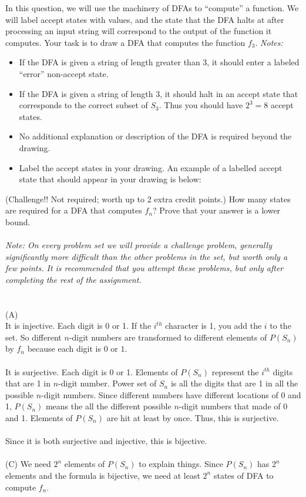 \documentclass[solution, letterpaper]{cs121}
\begin{document}
\subproblem In this question, we will use the machinery of DFAs to ``compute'' a function. We will label accept states with values, and the state that the DFA halts at after processing an input string will correspond to the output of the function it computes. Your task is to draw a DFA that computes the function $f_3$. \textit{Notes: } 
\begin{itemize}
\item If the DFA is given a string of length greater than 3, it should enter a labeled ``error'' non-accept state. 
\item If the DFA is given a string of length 3, it should halt in an accept state that corresponds to the correct subset of $S_3$.  Thus you should have $2^3 = 8$ accept states. 
\item No additional explanation or description of the DFA is required beyond the drawing. 
\item Label the accept states in your drawing. An example of a labelled accept state that should appear in your drawing is below:\\

\end{itemize}
\subproblem (Challenge!! Not required; worth up to 2 extra credit points.) How many states are required for a DFA that computes $f_n$? Prove that your answer is a lower bound.\\\\
\textit{Note: On every problem set we will provide a challenge problem, generally significantly more difficult than the other problems in the set, but worth only a few points. It is recommended that you attempt these problems, but only after completing the rest of the assignment.} 
\\\\
\\\noindent 
{(A) }  
\\\noindent 
It is injective. Each digit is 0 or 1. If the $i^{th}$  character is 1, you add the $i$ to the set. So different $n$-digit numbers are transformed to different elements of $P(S_n)$ by $f_n$ because each digit is $0$ or $1$. 
\\\\\noindent 
It is surjective. Each digit is 0 or 1.  Elements of $P(S_n)$ represent the $i^{th}$ digits that are 1 in $n$-digit number. Power set of $S_n$ is all the digits that are 1 in all the possible $n$-digit numbers. Since different numbers have different locations of 0 and 1, $P(S_n)$ means the all the different possible $n$-digit numbers that made of 0 and 1. Elements of $P(S_n)$ are hit at least by once. Thus, this is surjective.
\\\\\noindent 
Since it is both surjective and injective, this is bijective.
\\\\\noindent 
(C)
We need $ 2^n $ elements of $P(S_n)$ to explain things. Since  $P(S_n)$ has $ 2^n $  elements and the formula is bijective, 
we need at least $ 2^n $ states of DFA to compute $f_n$. 
\end{document}
